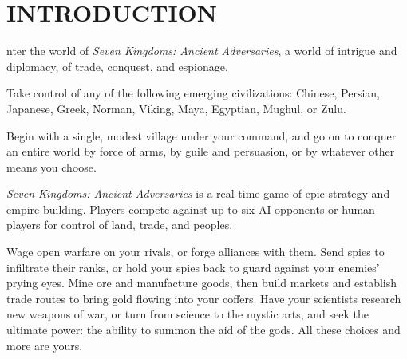 
\chapter{\textsf{INTRODUCTION}}

nter the world of \textit{Seven Kingdoms: Ancient Adversaries}, a world of intrigue and diplomacy, of trade, conquest, and espionage.

Take control of any of the following emerging civilizations: Chinese, Persian, Japanese, Greek, Norman, Viking, Maya, Egyptian, Mughul, or Zulu.

Begin with a single, modest village under your command, and go on to conquer an entire world by force of arms, by guile and persuasion, or by whatever other means you choose.


\textit{Seven Kingdoms: Ancient Adversaries} is a real-time game of epic strategy and empire building. Players compete against up to six AI opponents or human players for control of land, trade, and peoples.


Wage open warfare on your rivals, or forge alliances with them. Send spies to infiltrate their ranks, or hold your spies back to guard against your enemies’ prying eyes. Mine ore and manufacture goods, then build markets and establish trade routes to bring gold flowing into your coffers. Have your scientists research new weapons of war, or turn from science to the mystic arts, and seek the ultimate power: the ability to summon the aid of the gods. All these choices and more are yours.